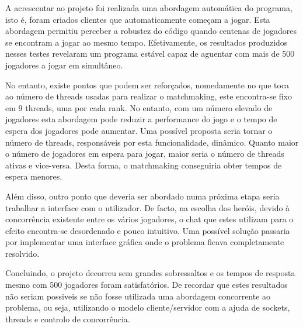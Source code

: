 \documentclass[a4paper]{article}
\begin{document}
\hspace{3mm} A acrescentar ao projeto foi realizada uma abordagem automática do programa, isto é, foram criados clientes que automaticamente começam a jogar. Esta abordagem permitiu perceber a robustez do código quando centenas de jogadores se encontram a jogar ao mesmo tempo. Efetivamente, os resultados produzidos nesses testes revelaram um programa estável capaz de aguentar com mais de 500 jogadores a jogar em simultâneo.

No entanto, existe pontos que podem ser reforçados, nomedamente no que toca ao número de threads usadas para realizar o matchmaking, este encontra-se fixo em 9 threads, uma por cada rank. No entanto, com um número elevado de jogadores esta abordagem pode reduzir a performance do jogo e o tempo de espera dos jogadores pode aumentar. Uma possível proposta seria tornar o número de threads, responsáveis por esta funcionalidade, dinâmico. Quanto maior o número de jogadores em espera para jogar, maior seria o número de threads ativas e vice-versa. Desta forma, o matchmaking conseguiria obter tempos de espera menores.

Além disso, outro ponto que deveria ser abordado numa próxima etapa seria trabalhar a interface com o utilizador. De facto, na escolha dos heróis, devido à concorrência existente entre os vários jogadores, o chat que estes utilizam para o efeito encontra-se desordenado e pouco intuitivo. Uma possível solução passaria por implementar uma interface gráfica onde o problema ficava completamente resolvido.

Concluindo, o projeto decorreu sem grandes sobressaltos e os tempos de resposta mesmo com 500 jogadores foram satisfatórios. De recordar que estes resultados não seriam possiveis se não fosse utilizada uma abordagem concorrente ao problema, ou seja, utilizando o modelo cliente/servidor com a ajuda de sockets, threads e controlo de concorrência.
\end{document}
